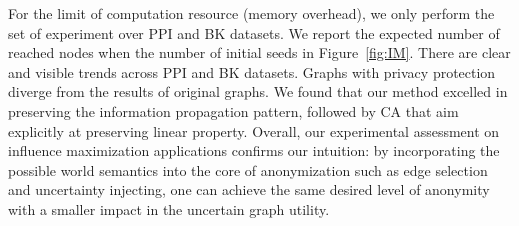 For the limit of computation resource (memory overhead), we only perform the set of experiment over PPI and BK datasets. We report the expected number of reached nodes when the number of initial seeds in Figure~\ref{fig:IM}. 
There are clear and visible trends across PPI and BK datasets. 
Graphs with privacy protection diverge from the results of original graphs.
We found that our method excelled in preserving the information propagation pattern, followed by CA that aim explicitly at preserving linear property.  
Overall, our experimental assessment on influence maximization applications confirms our intuition: by incorporating the possible world semantics into the core of anonymization such as edge selection and uncertainty injecting, one can achieve the same desired level of anonymity with a smaller impact in the uncertain graph utility.  